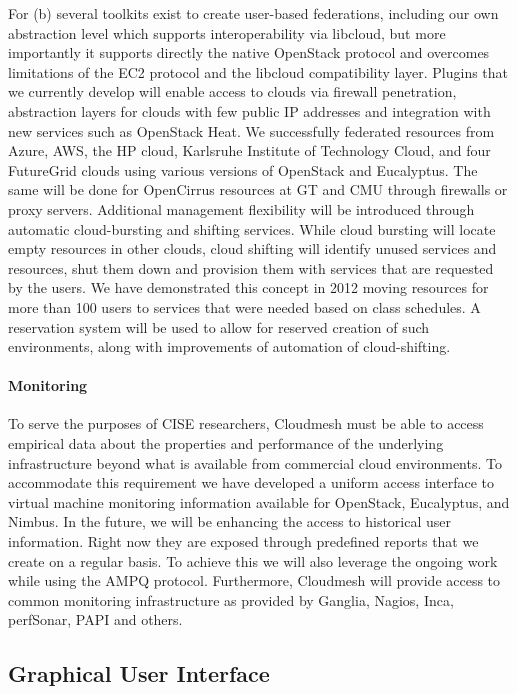 \documentclass{tex/sig-alternate-2013}
\newcommand{\todo}[1]{{\color{red}{#1}}}
\newcommand{\READ}{\todo{READ}}
\begin{document}
For (b) several toolkits exist to create user-based federations, including our own abstraction level which supports interoperability via libcloud, but more importantly it supports directly the native OpenStack protocol and overcomes limitations of the EC2 protocol and the libcloud compatibility layer. Plugins that we currently develop will enable access to clouds via firewall penetration, abstraction layers for clouds with few public IP addresses and integration with new services such as OpenStack Heat. We successfully federated resources from Azure, AWS, the HP cloud, Karlsruhe Institute of Technology Cloud, and four FutureGrid clouds using various versions of OpenStack and Eucalyptus. The same will be done for OpenCirrus resources at GT and CMU through firewalls or proxy servers.
Additional management flexibility will be introduced through automatic cloud-bursting and shifting services. While cloud bursting will locate empty resources in other clouds, cloud shifting will identify unused services and resources, shut them down and provision them with services that are requested by the users. We have demonstrated this concept in 2012 moving resources for more than 100 users to services that were needed based on class schedules. A reservation system will be used to allow for reserved creation of such environments, along with improvements of automation of cloud-shifting.





\paragraph{Monitoring \READ}

To serve the purposes of CISE researchers, Cloudmesh must be able to access empirical data about the properties and performance of the underlying infrastructure beyond what is available from commercial cloud environments. To accommodate this requirement we have developed a uniform access interface to virtual machine monitoring information available for OpenStack, Eucalyptus, and Nimbus. In the future, we will be enhancing the access to historical user information. Right now they are exposed through predefined reports that we create on a regular basis. To achieve this we will also leverage the ongoing work while using the AMPQ protocol. Furthermore, Cloudmesh will provide access to common monitoring infrastructure as provided by Ganglia, Nagios, Inca, perfSonar, PAPI and others.


\subsection{Graphical User Interface \READ}
\end{document}
